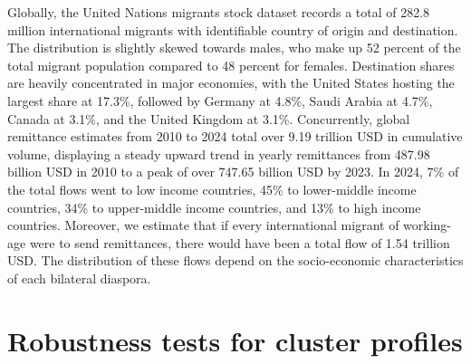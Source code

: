 \documentclass[fleqn,10pt,twocolumn]{wlscirep}
\begin{document}
Globally, the United Nations migrants stock dataset records a total of 282.8 million international migrants with identifiable country of origin and destination. The distribution is slightly skewed towards males, who make up 52 percent of the total migrant population compared to 48 percent for females. Destination shares are heavily concentrated in major economies, with the United States hosting the largest share at 17.3\%, followed by Germany at 4.8\%, Saudi Arabia at 4.7\%, Canada at 3.1\%, and the United Kingdom at 3.1\%. Concurrently, global remittance estimates from 2010 to 2024 total over 9.19 trillion USD in cumulative volume, displaying a steady upward trend in yearly remittances from 487.98 billion USD in 2010 to a peak of over 747.65 billion USD by 2023. In 2024, 7\% of the total flows went to low income countries, 45\% to lower-middle income countries, 34\% to upper-middle income countries, and 13\% to high income countries. Moreover, we estimate that if every international migrant of working-age were to send remittances, there would have been a total flow of 1.54 trillion USD. The distribution of these flows depend on the socio-economic characteristics of each bilateral diaspora. 

\section{Robustness tests for cluster profiles}
\end{document}
